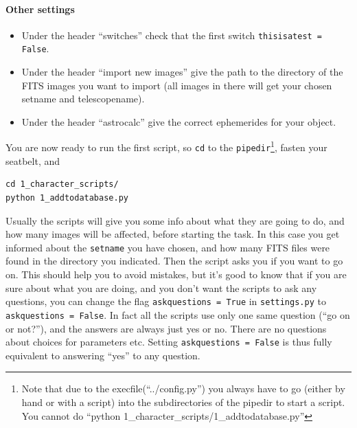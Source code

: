 \paragraph{Other settings}

\begin{itemize}
 \item Under the header ``switches'' check that the first switch \verb+thisisatest = False+. 
\item Under the header ``import new images'' give the path to the directory of the FITS images you want to import (all images in there will get your chosen setname and telescopename).
\item Under the header ``astrocalc'' give the correct ephemerides for your object.
\end{itemize}


You are now ready to run the first script, so
\verb+cd+ to the \verb+pipedir+\footnote{Note that due to the execfile(``../config.py'') you always have to go (either by hand or with a script) into the subdirectories of the pipedir to start a script. You cannot do ``python 1\_character\_scripts/1\_addtodatabase.py''}, fasten your seatbelt, and

\begin{Verbatim}
cd 1_character_scripts/
python 1_addtodatabase.py
\end{Verbatim}

Usually the scripts will give you some info about what they are going to do, and how many images will be affected, before starting the task. In this case you get informed about the \verb+setname+ you have chosen, and how many FITS files were found in the directory you indicated. Then the script asks you if you want to go on. This should help you to  avoid mistakes, but it's good to know that if you are sure about what you are doing, and you don't want the scripts to ask any questions, you can change the flag \verb+askquestions = True+ in \verb+settings.py+ to \verb+askquestions = False+. In fact all the scripts use only one same question (``go on or not?''), and the answers are always just yes or no. There are no questions about choices for parameters etc. Setting \verb+askquestions = False+ is thus fully equivalent to answering ``yes'' to any question.

